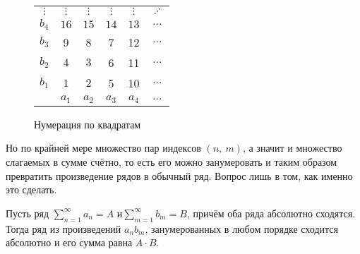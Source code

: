 \documentclass[a4paper, 12pt]{article}
\begin{document}
	\begin{wrapfigure}{l}{0.3\linewidth}
		\begin{tabular}[t]{c|ccccc}
			$\vdots$ & $\vdots$ & $\vdots$ & $\vdots$ &$\vdots$& $\iddots$ \\
			$b_4$ & $16$ & $15$ & $14$ & $13$ &$\dots$\\
			$b_3$ & 9 & 8 & 7 &  12&$\dots$ \\
			$b_2$ & $4$ & $3$ & 6 & 11&$\dots$ \\
			$b_1$ & $1$ & $2$ & 5 & 10& $\dots $\\
			\hline
			& $a_1$ & $a_2$ & $a_3$ & $a_4$ &$\dots$ 
		\end{tabular}
		\caption{Нумерация по квадратам}
		\vspace{-40pt}
	\end{wrapfigure}
	Но по крайней мере множество пар индексов $(n,\ m)$, а значит и множество слагаемых в сумме счётно, то есть его можно занумеровать и таким образом превратить произведение рядов в обычный ряд. Вопрос лишь в том, как именно это сделать.
	
	\begin{Theorem}
		Пусть ряд $\sum\limits_{n=1}^{\infty}a_n =A $ и$ \sum\limits_{m=1}^{\infty}b_m = B$, причём оба ряда абсолютно сходятся. Тогда ряд из произведений $a_nb_m$, занумерованных в любом порядке сходится абсолютно и его сумма равна $A\cdot B$.
	\end{Theorem}
\end{document}
